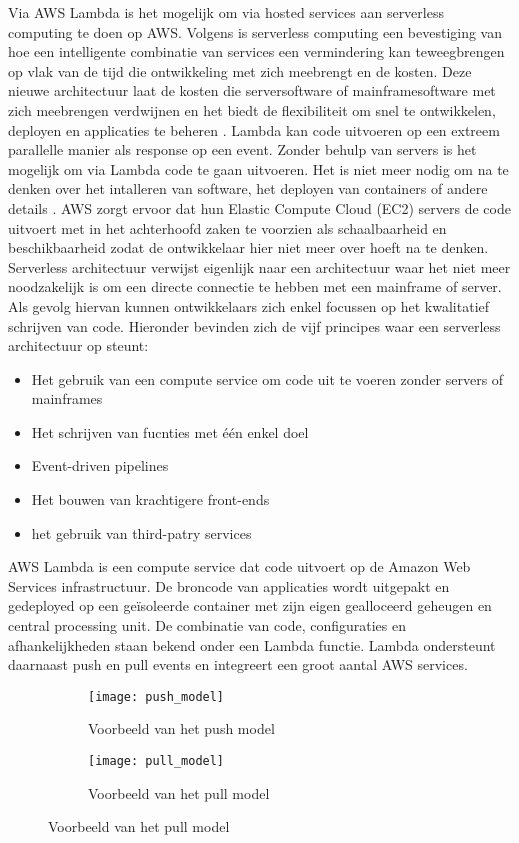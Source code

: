 Via AWS Lambda is het mogelijk om via hosted services aan serverless computing te doen op AWS. Volgens \textcite{Sbarski2017} is serverless computing een bevestiging van hoe een intelligente combinatie van services een vermindering kan teweegbrengen op vlak van de tijd die ontwikkeling met zich meebrengt en de kosten. Deze nieuwe architectuur laat de kosten die serversoftware of mainframesoftware met zich meebrengen verdwijnen en het biedt de flexibiliteit om snel te ontwikkelen, deployen en applicaties te beheren \autocite{Sbarski2017}. Lambda kan code uitvoeren op een extreem parallelle manier als response op een event. Zonder behulp van servers is het mogelijk om via Lambda code te gaan uitvoeren. Het is niet meer nodig om na te denken over het intalleren van software, het deployen van containers of andere details \autocite{Sbarski2017}. AWS zorgt ervoor dat hun Elastic Compute Cloud (EC2) servers de code uitvoert met in het achterhoofd zaken te voorzien als schaalbaarheid en beschikbaarheid zodat de ontwikkelaar hier niet meer over hoeft na te denken. Serverless architectuur verwijst eigenlijk naar een architectuur waar het niet meer noodzakelijk is om een directe connectie te hebben met een mainframe of server. Als gevolg hiervan kunnen ontwikkelaars zich enkel focussen op het kwalitatief schrijven van code. Hieronder bevinden zich de vijf principes waar een serverless architectuur op steunt:
 \begin{itemize}
    \item Het gebruik van een compute service om code uit te voeren zonder servers of mainframes
    \item Het schrijven van fucnties met één enkel doel
    \item Event-driven pipelines
    \item Het bouwen van krachtigere front-ends
    \item het gebruik van third-patry services
\end{itemize}

AWS Lambda is een compute service dat code uitvoert op de Amazon Web Services infrastructuur. De broncode van applicaties wordt uitgepakt en gedeployed op een geïsoleerde container met zijn eigen gealloceerd geheugen en central processing unit. De combinatie van code, configuraties en afhankelijkheden staan bekend onder een Lambda functie. Lambda ondersteunt daarnaast push en pull events en integreert een groot aantal AWS services. 
\begin{figure}[h]
    \centering
    \begin{subfigure}{0.45\textwidth}
        \texttt{[image: push\_model]}
        \caption{Voorbeeld van het push model \autocite{Sbarski2017}}
    \end{subfigure}
    \hfill
    \begin{subfigure}{0.45\textwidth}
        \texttt{[image: pull\_model]}
        \caption{Voorbeeld van het pull model \autocite{Sbarski2017}}
    \end{subfigure}
\end{figure}

